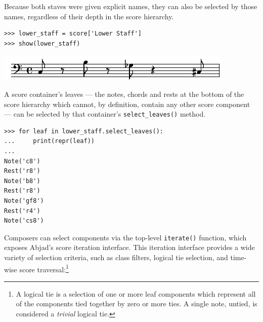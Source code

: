\documentclass{article}
\begin{document}
Because both staves were given explicit names, they can also be selected by
those names, regardless of their depth in the score hierarchy.

\begin{lstlisting}
>>> lower_staff = score['Lower Staff']
>>> show(lower_staff)
\end{lstlisting}
\includegraphics{assets/lilypond-fa746e527d218a814e36af2f46d314bb.pdf}

A score container's leaves --- the notes, chords and rests at the bottom of the
score hierarchy which cannot, by definition, contain any other score component
--- can be selected by that container's \texttt{select\_leaves()} method.

\begin{lstlisting}
>>> for leaf in lower_staff.select_leaves():
...     print(repr(leaf))
...
Note('c8')
Rest('r8')
Note('b8')
Rest('r8')
Note('gf8')
Rest('r4')
Note('cs8')
\end{lstlisting}

Composers can select components via the top-level \texttt{iterate()} function,
which exposes Abjad's score iteration interface. This iteration interface
provides a wide variety of selection criteria, such as class filters, logical
tie selection, and time-wise score traversal:\footnote{A logical tie is a
selection of one or more leaf components which represent all of the components
tied together by zero or more ties. A single note, untied, is considered a
\emph{trivial} logical tie.}

\end{document}
